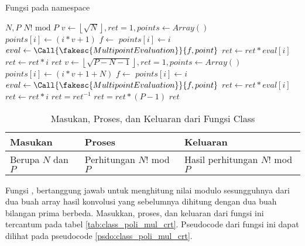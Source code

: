 \begin{algorithm}
	\caption{Fungsi  pada namespace }
	\label{psdo:class_poli_factmod}
	\begin{algorithmic}[1]
		\Require $ N, P $
		\Ensure $ N! \text{ mod } P $
		\State {}
			\State $ v \leftarrow \left \lfloor \sqrt{N} \right \rfloor, ret = 1, points \leftarrow Array() $
			 $points[i] \leftarrow (i * v + 1)$
			\EndFor
			\State $ f \leftarrow $ 
			 $points[i] \leftarrow i$
			\EndFor
			\State $ eval \leftarrow \Call{\fakesc{MultipointEvaluation}}{f, point}$
			 $ret \leftarrow ret * eval[i]$
			\EndFor
			 $ret \leftarrow ret * i$
			\EndFor
			\State \Return $ ret $
		\Else
			\State $ v \leftarrow \left \lfloor \sqrt{P-N-1} \right \rfloor, ret = 1, points \leftarrow Array() $
			 $points[i] \leftarrow (i * v + 1 + N)$
			\EndFor
			\State $ f \leftarrow $ 
			 $points[i] \leftarrow i$
			\EndFor
			\State $ eval \leftarrow \Call{\fakesc{MultipointEvaluation}}{f, point}$
			 $ret \leftarrow ret * eval[i]$
			\EndFor
			 $ret \leftarrow ret * i$
			\EndFor
			\State $ ret = ret ^{-1}$
			 $ ret = ret * (P-1)$ \EndIf
			\State \Return $ ret $
		\EndIf
	\end{algorithmic}
\end{algorithm}

\begin{table}[]	
	\Centering
	\begin{tabular}{|p{3cm}|p{3cm}|p{3cm}|}
	\hline
	Masukan & Proses & Keluaran \\ \hline
	Berupa $N$ dan $P$ & Perhitungan $ N! $ mod $P$ & Hasil perhitungan $ N! $ mod $P$ \\ \hline
	\end{tabular}
	\caption{Masukan, Proses, dan Keluaran dari Fungsi  Class }
	\label{tab:class_poli_factmod}
\end{table}

Fungsi , bertanggung jawab untuk menghitung nilai modulo sesungguhnya dari dua buah array hasil konvolusi yang sebelumnya dihitung dengan dua buah bilangan prima berbeda. Masukkan, proses, dan keluaran dari fungsi ini tercantum pada tabel \ref{tab:class_poli_mul_crt}. Pseudocode dari fungsi ini dapat dilihat pada pseudocode \ref{psdo:class_poli_mul_crt}.

